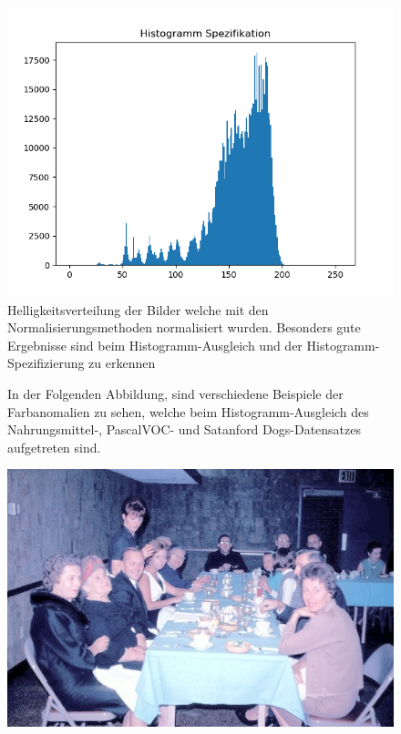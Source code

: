 \begin{appendices}
\begin{figure}[htbp]
\begin{minipage}{0.49\textwidth}
\end{minipage}
\begin{minipage}{0.49\textwidth}
\includegraphics[width=\textwidth]{Sources/Anhang/resize_0250_HS.png}
\end{minipage}
\caption{Helligkeitsverteilung der Bilder welche mit den Normalisierungsmethoden normalisiert wurden. Besonders gute Ergebnisse sind beim Histogramm-Ausgleich und der Histogramm-Spezifizierung zu erkennen}
\label{img:hellver}
\end{figure}
\newpage
\begin{figure}[htb]
\center
\begin{minipage}{\textwidth}
In der Folgenden Abbildung, sind verschiedene Beispiele der Farbanomalien zu sehen, welche beim Histogramm-Ausgleich des Nahrungsmittel-, PascalVOC- und Satanford Dogs-Datensatzes aufgetreten sind.
\end{minipage}
\begin{minipage}{\textwidth}
\hspace{\textwidth}
\end{minipage}
\begin{minipage}{0.19\textwidth}
\includegraphics[width=\textwidth]{images/anomalien/HA/000613.jpg}

\end{minipage}
\end{figure}
\end{appendices}
